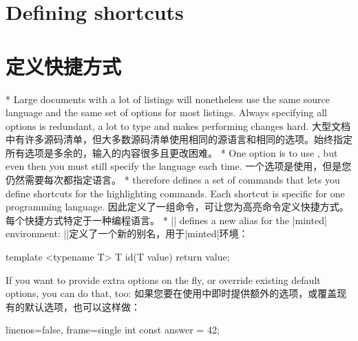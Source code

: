 
\begin{paracol}{2}
\section{Defining shortcuts}
\switchcolumn
\section{定义快捷方式}
\switchcolumn[0]*%
Large documents with a lot of listings will nonetheless use the same source language and the
same set of options for most listings.
Always specifying all options is redundant, a lot to type and makes performing changes hard.
\switchcolumn
大型文档中有许多源码清单，但大多数源码清单使用相同的源语言和相同的选项。始终指定所有选项是多余的，输入的内容很多且更改困难。
\switchcolumn[0]*%
One option is to use \cmd\setminted, but even then you must still specify the language each time.
\switchcolumn
一个选项是使用\cmd\setminted，但是您仍然需要每次都指定语言。
\switchcolumn[0]*%
 therefore defines a set of commands that lets you define shortcuts for the highlighting commands.
Each shortcut is specific for one programming language.
\switchcolumn
{}因此定义了一组命令，可让您为高亮命令定义快捷方式。每个快捷方式特定于一种编程语言。
\switchcolumn[0]*%
\DescribeMacro{\newminted}
|\newminted| defines a new alias for the |minted| environment:
\switchcolumn
\DescribeMacro{\newminted}
|\newminted|定义了一个新的别名，用于|minted|环境：
\end{paracol}


\begin{example}

    \begin{cppcode}
    template <typename T>
    T id(T value) {
        return value;
    }
    \end{cppcode}
\end{example}

\begin{paracol}{2}
If you want to provide extra options on the fly, or override existing default options, you can do that, too:
\switchcolumn
如果您要在使用中即时提供额外的选项，或覆盖现有的默认选项，也可以这样做：
\end{paracol}


\begin{example}

    \begin{cppcode*}{linenos=false,
                    frame=single}
    int const answer = 42;
    \end{cppcode*}
\end{example}

